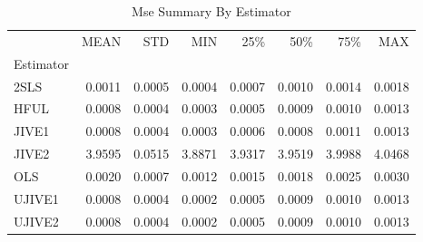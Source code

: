\begin{table}[ht]
\centering
\caption{Mse Summary By Estimator}
\begin{tabular}{lrrrrrrr}
\toprule
 & MEAN & STD & MIN & 25\% & 50\% & 75\% & MAX \\
Estimator &  &  &  &  &  &  &  \\
\midrule
2SLS & 0.0011 & 0.0005 & 0.0004 & 0.0007 & 0.0010 & 0.0014 & 0.0018 \\
HFUL & 0.0008 & 0.0004 & 0.0003 & 0.0005 & 0.0009 & 0.0010 & 0.0013 \\
JIVE1 & 0.0008 & 0.0004 & 0.0003 & 0.0006 & 0.0008 & 0.0011 & 0.0013 \\
JIVE2 & 3.9595 & 0.0515 & 3.8871 & 3.9317 & 3.9519 & 3.9988 & 4.0468 \\
OLS & 0.0020 & 0.0007 & 0.0012 & 0.0015 & 0.0018 & 0.0025 & 0.0030 \\
UJIVE1 & 0.0008 & 0.0004 & 0.0002 & 0.0005 & 0.0009 & 0.0010 & 0.0013 \\
UJIVE2 & 0.0008 & 0.0004 & 0.0002 & 0.0005 & 0.0009 & 0.0010 & 0.0013 \\
\bottomrule
\end{tabular}
\end{table}
